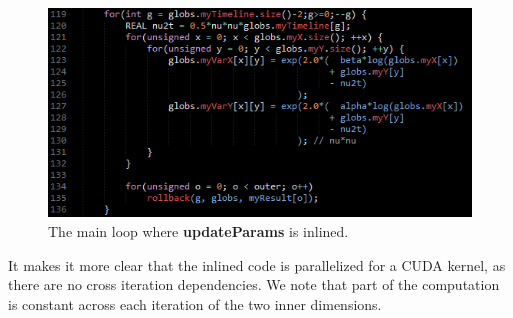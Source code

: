\begin{figure}[!ht]
	\centering
		\includegraphics[scale=0.75]{input/figures/inline_updateparams.png}
		\caption{The main loop where \textbf{updateParams} is inlined.\label{fig:inline_updateparams}}
\end{figure}

It makes it more clear that the inlined
code is parallelized for a CUDA kernel, as there are no cross iteration
dependencies. We note that part of the computation is constant across each
iteration of the two inner dimensions.
